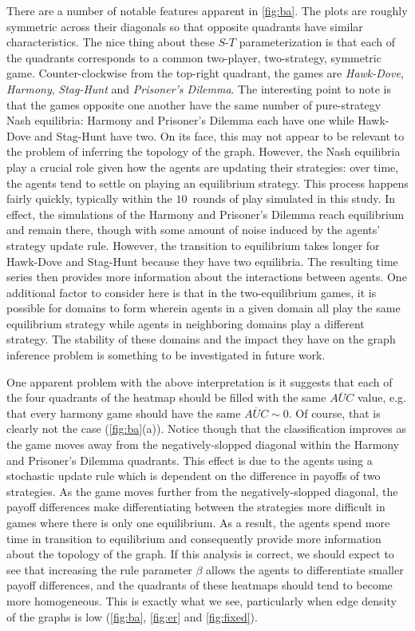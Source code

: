 \documentclass[letterpaper]{article}
\begin{document}
There are a number of notable features apparent in \cref{fig:ba}. The plots are roughly symmetric across their diagonals so that opposite quadrants have similar characteristics. The nice thing about these $S$-$T$ parameterization is that each of the quadrants corresponds to a common two-player, two-strategy, symmetric game. Counter-clockwise from the top-right quadrant, the games are \mbox{\textit{Hawk-Dove}}, \textit{Harmony}, \mbox{\textit{Stag-Hunt}} and \textit{Prisoner's Dilemma}. The interesting point to note is that the games opposite one another have the same number of pure-strategy Nash equilibria: Harmony and Prisoner's Dilemma each have one while \mbox{Hawk-Dove} and \mbox{Stag-Hunt} have two. On its face, this may not appear to be relevant to the problem of inferring the topology of the graph. However, the Nash equilibria play a crucial role given how the agents are updating their strategies: over time, the agents tend to settle on playing an equilibrium strategy. This process happens fairly quickly, typically within the \mbox{$10$ rounds} of play simulated in this study. In effect, the simulations of the Harmony and Prisoner's Dilemma reach equilibrium and remain there, though with some amount of noise induced by the agents' strategy update rule. However, the transition to equilibrium takes longer for \mbox{Hawk-Dove} and \mbox{Stag-Hunt} because they have two equilibria. The resulting time series then provides more information about the interactions between agents. One additional factor to consider here is that in the two-equilibrium games, it is possible for domains to form wherein agents in a given domain all play the same equilibrium strategy while agents in neighboring domains play a different strategy. The stability of these domains and the impact they have on the graph inference problem is something to be investigated in future work.

One apparent problem with the above interpretation is it suggests that each of the four quadrants of the heatmap should be filled with the same $\overline{AUC}$ value, e.g. that every harmony game should have the same $\overline{AUC} \sim 0$. Of course, that is clearly not the case (\cref{fig:ba}(a)). Notice though that the classification improves as the game moves away from the negatively-slopped diagonal within the Harmony and Prisoner's Dilemma quadrants. This effect is due to the agents using a stochastic update rule which is dependent on the difference in payoffs of two strategies. As the game moves further from the negatively-slopped diagonal, the payoff differences make differentiating between the strategies more difficult in games where there is only one equilibrium. As a result, the agents spend more time in transition to equilibrium and consequently provide more information about the topology of the graph. If this analysis is correct, we should expect to see that increasing the rule parameter $\beta$ allows the agents to differentiate smaller payoff differences, and the quadrants of these heatmaps should tend to become more homogeneous. This is exactly what we see, particularly when edge density of the graphs is low (\cref{fig:ba}, \cref{fig:er} and \cref{fig:fixed}).
\end{document}

